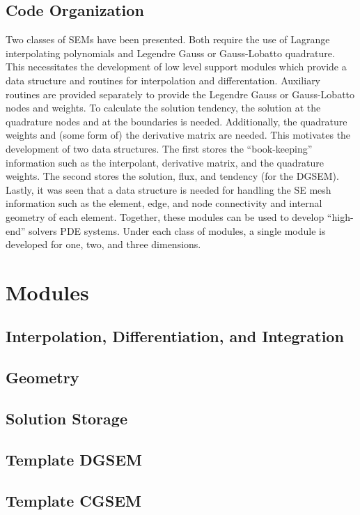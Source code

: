 \documentclass[12pt]{softwaremanual}
\begin{document}
\section{Code Organization}
Two classes of SEMs have been presented. Both require the use of Lagrange interpolating polynomials and Legendre Gauss or Gauss-Lobatto quadrature. This necessitates the development of low level support modules which provide a data structure and routines for interpolation and differentation. Auxiliary routines are provided separately to provide the Legendre Gauss or Gauss-Lobatto nodes and weights. To calculate the solution tendency, the solution at the quadrature nodes and at the boundaries is needed. Additionally, the quadrature weights and (some form of) the derivative matrix are needed. This motivates the development of two data structures. The first stores the ``book-keeping'' information such as the interpolant, derivative matrix, and the quadrature weights. The second stores the solution, flux, and tendency (for the DGSEM). Lastly, it was seen that a data structure is needed for handling the SE mesh information such as the element, edge, and node connectivity and internal geometry of each element. Together, these modules can be used to develop ``high-end'' solvers PDE systems. Under each class of modules, a single module is developed for one, two, and three dimensions.


\chapter{Modules}
\section{Interpolation, Differentiation, and Integration}


\section{Geometry}

\section{Solution Storage}

\section{Template DGSEM}

\section{Template CGSEM}
\end{document}

